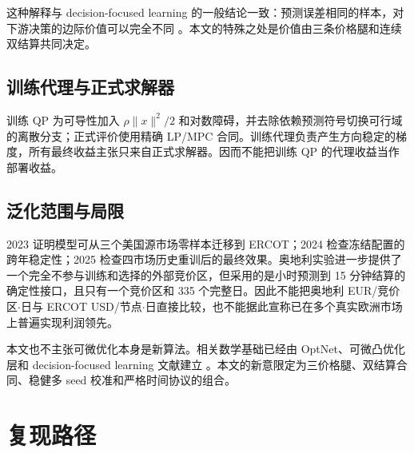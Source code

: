 \documentclass[UTF8,a4paper,11pt,fontset=fandol]{ctexart}
\begin{document}
这种解释与 decision-focused learning 的一般结论一致：预测误差相同的样本，对下游决策的边际价值可以完全不同
\cite{donti2017,elmachtoub2022,mandi2024}。本文的特殊之处是价值由三条价格腿和连续双结算共同决定。

\subsection{训练代理与正式求解器}

训练 QP 为可导性加入 $\rho\|x\|^2/2$ 和对数障碍，并去除依赖预测符号切换可行域的离散分支；正式评价使用精确 LP/MPC 合同。训练代理负责产生方向稳定的梯度，所有最终收益主张只来自正式求解器。因而不能把训练 QP 的代理收益当作部署收益。

\subsection{泛化范围与局限}

2023 证明模型可从三个美国源市场零样本迁移到 ERCOT；2024 检查冻结配置的跨年稳定性；2025 检查四市场历史重训后的最终效果。奥地利实验进一步提供了一个完全不参与训练和选择的外部竞价区，但采用的是小时预测到 15 分钟结算的确定性接口，且只有一个竞价区和 335 个完整日。因此不能把奥地利 EUR/竞价区$\cdot$日与 ERCOT USD/节点$\cdot$日直接比较，也不能据此宣称已在多个真实欧洲市场上普遍实现利润领先。

本文也不主张可微优化本身是新算法。相关数学基础已经由 OptNet、可微凸优化层和 decision-focused learning 文献建立
\cite{amos2017,agrawal2019,donti2017}。本文的新意限定为三价格腿、双结算合同、稳健多 seed 校准和严格时间协议的组合。

\section{复现路径}
\end{document}
